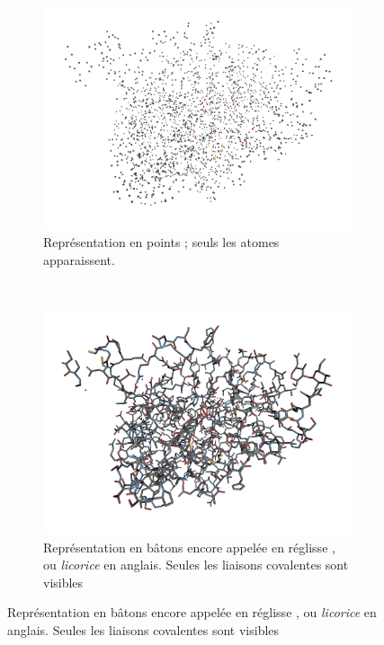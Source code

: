 	\newcommand{\subImgW}{0.5\textwidth}
	\begin{figure}[H]
		\begin{subfigure}[t]{\subImgW}
			\centering
			\includegraphics[width=\textwidth]{./figures/ch1/4awn_points}
			\caption{Représentation en \og points \fg{} ; seuls les atomes apparaissent.}
			\label{fig:4awn_points}
		\end{subfigure}
		~
		\begin{subfigure}[t]{\subImgW}
			\centering
			\includegraphics[width=\textwidth]{./figures/ch1/4awn_licorice}
			\caption{Représentation en \og bâtons \fg{} encore appelée en \og réglisse \fg{}, ou \emph{licorice} en anglais. Seules les liaisons covalentes sont visibles}
			\label{fig:4awn_licorice}
		\end{subfigure}

\end{figure}
